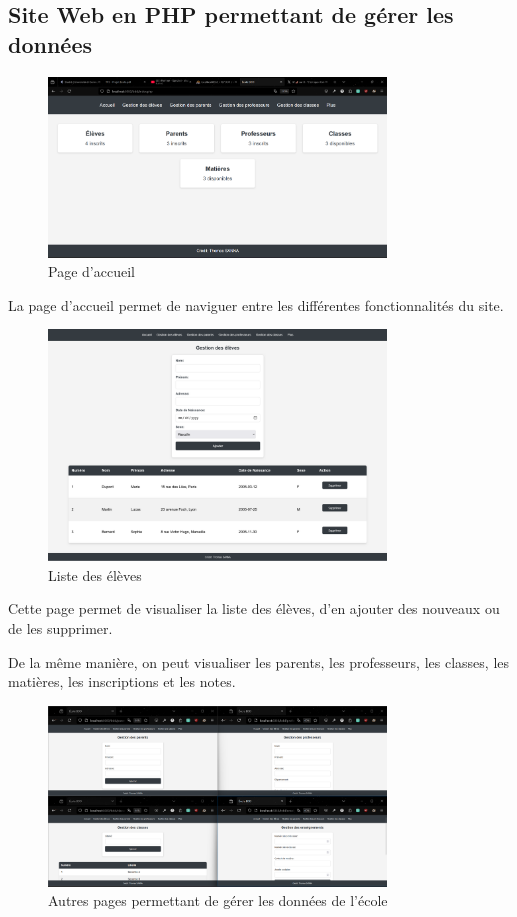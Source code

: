 \documentclass[a4paper,12pt]{article}
\begin{document}
\subsection{Site Web en PHP permettant de gérer les données}

\begin{figure}[H]
    \centering
    \includegraphics[width=0.8\textwidth]{imgSite/accueil.png}
    \caption{Page d'accueil}
\end{figure}

La page d'accueil permet de naviguer entre les différentes fonctionnalités du site.

\begin{figure}[H]
    \centering
    \includegraphics[width=0.8\textwidth]{imgSite/eleve.png}
    \caption{Liste des élèves}
\end{figure}

Cette page permet de visualiser la liste des élèves, d'en ajouter des nouveaux ou de les supprimer.

De la même manière, on peut visualiser les parents, les professeurs, les classes, les matières, les inscriptions et les notes.

\begin{figure}[H]
    \centering
    \includegraphics[width=0.8\textwidth]{imgSite/all.png}
    \caption{Autres pages permettant de gérer les données de l'école}
\end{figure}
\end{document}
